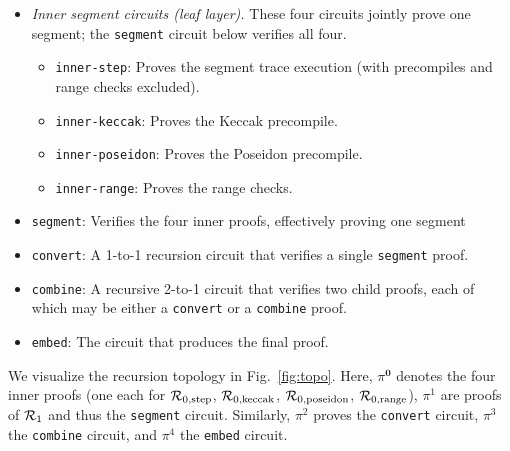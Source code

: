 \begin{itemize}
  \item \emph{Inner segment circuits (leaf layer).} These four circuits jointly prove one segment; the \texttt{segment} circuit below verifies all four.
  \begin{itemize}[label=$\cdot$]
    \item \texttt{inner-step}: Proves the segment trace execution (with precompiles and range checks excluded).
    \item \texttt{inner-keccak}: Proves the Keccak precompile.
    \item \texttt{inner-poseidon}: Proves the Poseidon precompile.
    \item \texttt{inner-range}: Proves the range checks.
  \end{itemize}
	\item \texttt{segment}: Verifies the four inner proofs, effectively proving one segment
	\item \texttt{convert}: A 1-to-1 recursion circuit that verifies a single \texttt{segment} proof.
	\item \texttt{combine}: A recursive 2-to-1 circuit that verifies two child proofs, each of which may be either a \texttt{convert} or a \texttt{combine} proof.
	\item \texttt{embed}: The circuit that produces the final proof.
\end{itemize}


We visualize the recursion topology in Fig.~\ref{fig:topo}. Here,
$\pi^{\mathbf{0}}$ denotes the four inner proofs (one each for $\mathcal{R}_{0,\mathrm{step}}$, $\mathcal{R}_{0,\mathrm{keccak}}$, $\mathcal{R}_{0,\mathrm{poseidon}}$, $\mathcal{R}_{0,\mathrm{range}}$),
 $\pi^1$ are proofs of $\mathcal{R}_1$ and thus the \texttt{segment} circuit. Similarly, $\pi^2$ proves the \texttt{convert} circuit, $\pi^3$ the \texttt{combine} circuit, and $\pi^4$ the \texttt{embed} circuit.

